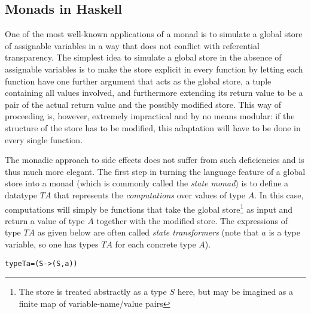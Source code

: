 \subsection{Monads in Haskell}
\label{sec:monads-haskell}

One of the most well-known applications of a monad is to simulate a global store
of assignable variables in a way that does not conflict with referential
transparency. The simplest idea to simulate a global store in the absence of
assignable variables is to make the store explicit in every function by letting
each function have one further argument that acts as the global store, \EG a
tuple containing all values involved, and furthermore extending its return value
to be a pair of the actual return value and the possibly modified store. This
way of proceeding is, however, extremely impractical and by no means modular: if
the structure of the store has to be modified, this adaptation will have to be
done in every single function.

The monadic approach to side effects does not suffer from such deficiencies and
is thus much more elegant. The first step in turning the language feature of a
global store into a monad (which is commonly called the \emph{state monad}) is
to define a datatype $T A$ that represents the \emph{computations} over values
of type $A$. In this case, computations will simply be functions that take the
global store\footnote{The store is treated abstractly as a type $S$ here, but
  may be imagined as a finite map of variable-name/value pairs} as input and
return a value of type $A$ together with the modified store. The expressions of
type $T A$ as given below are often called \emph{state transformers} (note that
$a$ is a type variable, so one has types $T A$ for each concrete type $A$).
\begin{alltt}
  type T a = (S -> (S, a))
\end{alltt}

